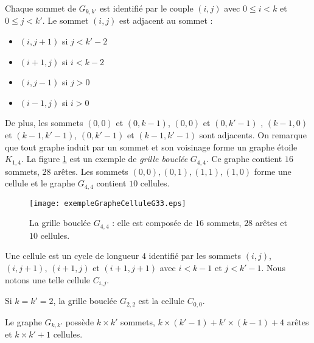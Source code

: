 Chaque sommet de $G_{k,k'}$ est identifi\'e par le couple $(i,j)$ avec $0 \le i < k$ et $0 \le j < k'$. Le sommet $(i,j)$ est adjacent  au sommet :
\begin{itemize}
	\item $(i, j+1)$ si $j < k'-2$
	\item $(i+1,j)$ si $i < k-2$
	\item $(i,j-1)$ si $j > 0$
	\item $(i-1,j)$ si $i > 0$
\end{itemize}
De plus, les sommets  $(0,0)$ et $(0,k-1)$,  $(0,0)$ et $(0,k'-1)$ , $(k-1,0)$ et $(k-1,k'-1)$, $(0,k'-1)$ et $(k-1,k'-1)$ sont adjacents.
On remarque que tout graphe  induit par un sommet et son voisinage forme un graphe \'etoile $K_{1,4}$.
La figure \ref{exempleGrapheCellule} est un exemple de {\em grille boucl\'ee} $G_{4,4}$. Ce graphe contient $16$ sommets, $28$ ar\^etes. Les sommets $(0,0), (0,1), (1,1), (1,0)$ forme une cellule et le graphe $G_{4,4}$ contient  $10$ cellules. 
\begin{figure}[htb!] 
\centering
\texttt{[image: exempleGrapheCelluleG33.eps]}
\caption{ La grille boucl\'ee $G_{4,4}$ : elle est compos\'ee de $16$ sommets, $28$ ar\^etes et $10$ cellules. }
\label{exempleGrapheCellule} 
\end{figure}
\begin{definition}
Une cellule est un cycle de longueur $4$ identifi\'e par les sommets $(i,j)$, $(i,j+1)$, $(i+1,j)$ et $(i+1,j+1)$ avec $i<k-1$ et $j<k'-1$. Nous notons une telle cellule $C_{i,j}$.
\end{definition}
Si $k = k' = 2$, la grille boucl\'ee $G_{2,2}$ est la cellule $C_{0,0}$.

\begin{property}
Le graphe $G_{k,k'}$ poss\`ede $k \times k'$ sommets,  $k \times (k'-1) + k' \times(k-1) + 4$  ar\^etes et $k \times k' +1$ cellules.
\end{property}
